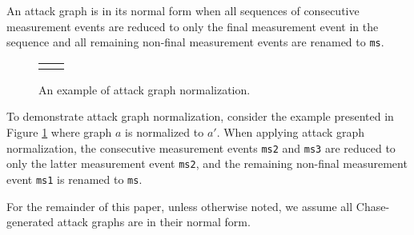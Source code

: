 \documentclass[runningheads]{llncs}
\theoremstyle{definition}
\begin{document}
\begin{definition}
    An attack graph is in its normal form when all sequences of consecutive measurement events are reduced to only the final measurement event in the sequence and all remaining non-final measurement events are renamed to \texttt{ms}. 
\end{definition}

\begin{figure}[htbp]
  \centering 
  \begin{tabular}{c c}
       &  
  \end{tabular}
  \captionsetup{justification=centering,margin=1cm}
  \caption[Example of attack graph normalization]{An example of attack graph normalization.}
  \label{fig:reduce-ex}
\end{figure}


\noindent To demonstrate attack graph normalization, consider the example presented in Figure \ref{fig:reduce-ex} where graph $a$ is normalized to $a'$. When applying attack graph normalization, the consecutive measurement events \texttt{ms2} and \texttt{ms3} are reduced to only the latter measurement event \texttt{ms2}, and the remaining non-final measurement event \texttt{ms1} is renamed to \texttt{ms}.

For the remainder of this paper, unless otherwise noted, we assume all Chase-generated attack graphs are in their normal form.


\end{document}
